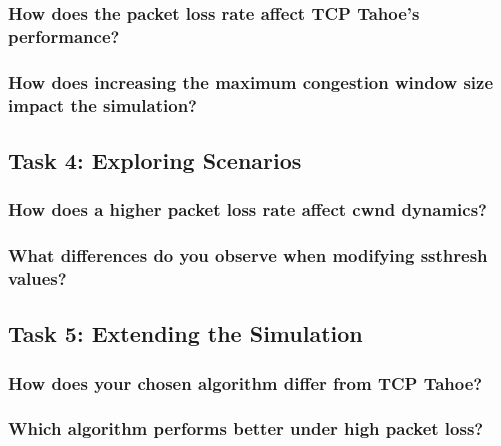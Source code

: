 \documentclass{article}
\begin{document}
\subsubsection{How does the packet loss rate affect TCP Tahoe’s performance?}

\subsubsection{How does increasing the maximum congestion window size impact the simulation?}


\subsection{Task 4: Exploring Scenarios}

\subsubsection{How does a higher packet loss rate affect cwnd dynamics?}

\subsubsection{What differences do you observe when modifying ssthresh values?}


\subsection{Task 5: Extending the Simulation}

\subsubsection{How does your chosen algorithm differ from TCP Tahoe?}

\subsubsection{Which algorithm performs better under high packet loss?}
\end{document}

